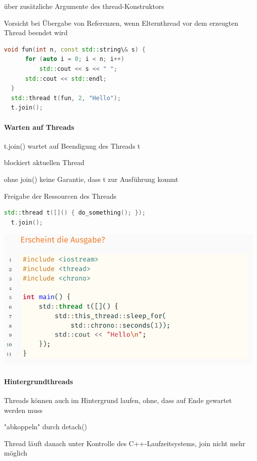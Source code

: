 \documentclass[10pt]{article}
\begin{document}
\begin{itemize*}
  \item über zusätzliche Argumente des thread-Konstruktors
  \item Vorsicht bei Übergabe von Referenzen, wenn Elternthread vor dem erzeugten Thread beendet wird
\end{itemize*}
\begin{lstlisting}[language=C++]
  void fun(int n, const std::string\& s) {
      for (auto i = 0; i < n; i++)
          std::cout << s << " ";
      std::cout << std::endl;
  }
  std::thread t(fun, 2, "Hello");
  t.join();
  \end{lstlisting}

\paragraph{Warten auf Threads}

\begin{itemize*}
  \item t.join() wartet auf Beendigung des Threads t
  \item blockiert aktuellen Thread
  \item ohne join() keine Garantie, dass t zur Ausführung kommt
  \item Freigabe der Ressourcen des Threads
\end{itemize*}
\begin{lstlisting}[language=C++]
  std::thread t([]() { do_something(); });
  t.join();
  \end{lstlisting}
\begin{center}
  \includegraphics[width=0.4\linewidth]{Assets/Programmierparadigmen-code-snippet-16}
\end{center}

\paragraph{Hintergrundthreads}

\begin{itemize*}
  \item Threads können auch im Hintergrund laufen, ohne, dass auf Ende gewartet werden muss
  \item "abkoppeln" durch detach()
  \item Thread läuft danach unter Kontrolle des C++-Laufzeitsystems, join nicht mehr möglich
\end{itemize*}
\end{document}
